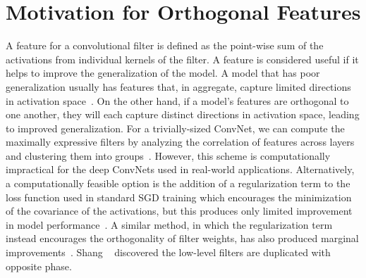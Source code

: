 \section{Motivation for Orthogonal Features}
A feature for a convolutional filter is defined as the point-wise sum of the activations from individual kernels of the filter.
A feature is considered useful if it helps to improve the generalization of the model.
A model that has poor generalization usually has features that, in aggregate, capture limited directions in activation space~\cite{Morcos2017OnTI}.
On the other hand, if a model's features are orthogonal to one another, they will each capture distinct directions in activation space, leading to improved generalization.
For a trivially-sized ConvNet, we can compute the maximally expressive filters by analyzing the correlation of features across layers and clustering them into groups~\cite{Arora2014ProvableBF}.
However, this scheme is computationally impractical for the deep ConvNets used in real-world applications.
Alternatively, a computationally feasible option is the addition of a regularization term to the loss function used in standard SGD training which encourages the minimization of the covariance of the activations, but this produces only limited improvement in model performance~\cite{Rodrguez2016RegularizingCW, Cogswell2015ReducingOI}.
A similar method, in which the regularization term instead encourages the orthogonality of filter weights, has also produced marginal improvements~\cite{Brock2016NeuralPE, Poole2014AnalyzingNI, Xie2017NearOrthogonalityRI, Xie2017AllYN}.
Shang \etal~\cite{Shang2016UnderstandingAI} discovered the low-level filters are duplicated with opposite phase. 

